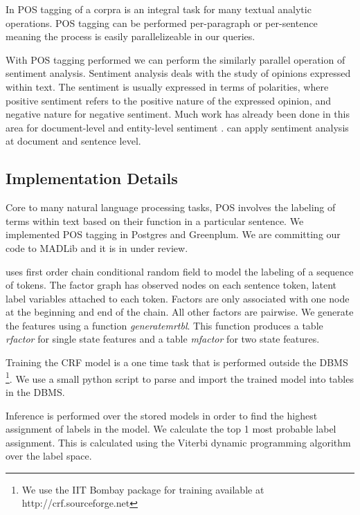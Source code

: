 In POS tagging of a corpra is an integral task for many 
textual analytic operations. POS tagging can be performed per-paragraph or 
per-sentence meaning the process is easily parallelizeable in our queries.

With POS tagging performed we can perform the similarly parallel operation 
of sentiment analysis.
Sentiment analysis deals with the study of opinions expressed within text. 
The sentiment is usually expressed in terms of polarities, where positive
sentiment refers to the positive nature of the expressed opinion, and negative
nature for negative sentiment. Much work has already been done in this
area for document-level and entity-level sentiment \cite{o2010tweets,
zhang2011combining}. 
{\system} can apply sentiment analysis at document and sentence level.


\subsection{Implementation Details}
\label{sec:impdis}


Core to many natural language processing tasks, POS involves the
labeling of terms within text based on their function in a particular sentence.
We implemented POS tagging in Postgres and Greenplum. We are
committing our code to MADLib and it is in under review.

\system uses first order chain conditional random field to model the labeling
of a sequence of tokens. The factor graph has observed nodes on each sentence
token, latent label variables attached to each token.
Factors are only associated with one node at the beginning and end of the chain.
All other factors are pairwise.  
We generate the features using a function \textit{generatemrtbl}. 
This function produces a table \textit{rfactor} for single state features and a 
table \textit{mfactor} for two state features.

Training the CRF model is a one time task that is performed outside the 
DBMS \footnote{We use the IIT Bombay package for training available at 
http://crf.sourceforge.net }.
We use a small python script to parse and import the trained model into 
tables in the DBMS. 

Inference is performed over the stored models in order to find the highest 
assignment of labels in the model.
We calculate the top 1 most probable label assignment. This is calculated using
the Viterbi dynamic programming algorithm over the label space.


